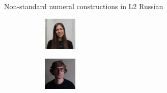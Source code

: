 \documentclass[
  ignorenonframetext,
  t]{beamer}
\begin{document}
\begin{frame}{Non-standard numeral constructions in L2 Russian}
\label{non-standard-numeral-constructions-in-l2-russian}
\begin{figure}

\begin{minipage}{0.50\linewidth}

\begin{figure}[H]

{\centering \includegraphics[width=0.63in,height=\textheight]{images/naccarato.jpg}

}


\end{figure}%

\end{minipage}%
%
\begin{minipage}{0.50\linewidth}

\begin{figure}[H]

{\centering \includegraphics[width=0.63in,height=\textheight]{images/moroz.jpeg}

}


\end{figure}%

\end{minipage}%

\end{figure}%
\end{frame}
\end{document}
